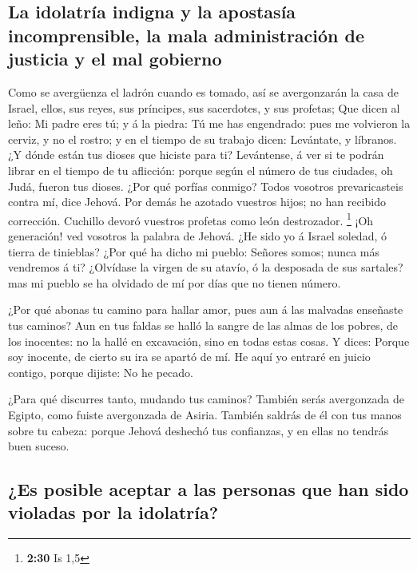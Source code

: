 \hypertarget{la-idolatruxeda-indigna-y-la-apostasuxeda-incomprensible-la-mala-administraciuxf3n-de-justicia-y-el-mal-gobierno}{%
\subsection{La idolatría indigna y la apostasía incomprensible, la mala
administración de justicia y el mal
gobierno}\label{la-idolatruxeda-indigna-y-la-apostasuxeda-incomprensible-la-mala-administraciuxf3n-de-justicia-y-el-mal-gobierno}}

 Como se avergüenza el ladrón cuando es tomado, así se
avergonzarán la casa de Israel, ellos, sus reyes, sus príncipes, sus
sacerdotes, y sus profetas;  Que dicen al leño: Mi padre
eres tú; y á la piedra: Tú me has engendrado: pues me volvieron la
cerviz, y no el rostro; y en el tiempo de su trabajo dicen: Levántate, y
líbranos.  ¿Y dónde están tus dioses que hiciste para ti?
Levántense, á ver si te podrán librar en el tiempo de tu aflicción:
porque según el número de tus ciudades, oh Judá, fueron tus dioses.
 ¿Por qué porfías conmigo? Todos vosotros prevaricasteis
contra mí, dice Jehová.  Por demás he azotado vuestros
hijos; no han recibido corrección. Cuchillo devoró vuestros profetas
como león destrozador. \footnote{\textbf{2:30} Is 1,5}  ¡Oh
generación! ved vosotros la palabra de Jehová. ¿He sido yo á Israel
soledad, ó tierra de tinieblas? ¿Por qué ha dicho mi pueblo: Señores
somos; nunca más vendremos á ti?  ¿Olvídase la virgen de su
atavío, ó la desposada de sus sartales? mas mi pueblo se ha olvidado de
mí por días que no tienen número.

 ¿Por qué abonas tu camino para hallar amor, pues aun á las
malvadas enseñaste tus caminos?  Aun en tus faldas se halló
la sangre de las almas de los pobres, de los inocentes: no la hallé en
excavación, sino en todas estas cosas.  Y dices: Porque soy
inocente, de cierto su ira se apartó de mí. He aquí yo entraré en juicio
contigo, porque dijiste: No he pecado.

 ¿Para qué discurres tanto, mudando tus caminos? También
serás avergonzada de Egipto, como fuiste avergonzada de Asiria.
 También saldrás de él con tus manos sobre tu cabeza:
porque Jehová deshechó tus confianzas, y en ellas no tendrás buen
suceso.

\hypertarget{es-posible-aceptar-a-las-personas-que-han-sido-violadas-por-la-idolatruxeda}{%
\subsection{¿Es posible aceptar a las personas que han sido violadas por
la
idolatría?}\label{es-posible-aceptar-a-las-personas-que-han-sido-violadas-por-la-idolatruxeda}}

